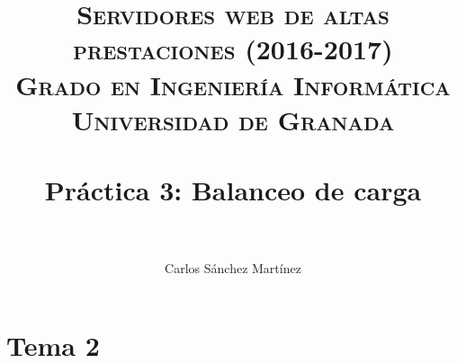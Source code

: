 


\title{
\normalfont \normalsize
\textsc{{\bf Servidores web de altas prestaciones (2016-2017)} \\ Grado en Ingeniería Informática \\ Universidad de Granada} \\ [25pt] %
\horrule{0.5pt} \\[0.4cm] %
\huge Práctica 3: Balanceo de carga\\ %
\horrule{2pt} \\[0.5cm] %
}

\author{Carlos Sánchez Martínez} %





\maketitle %

\newpage %

\tableofcontents %

\listoffigures

\listoftables

\newpage




\section{Tema 2}
